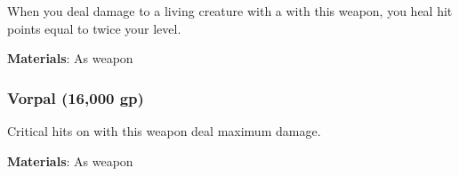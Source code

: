 When you deal damage to a living creature with a  with this weapon, you heal hit points equal to twice your level.



\vspace{0.25em}
\textbf{Materials}: As weapon


\lowercase{\hypertarget{item:Vorpal}{}}\label{item:Vorpal}
\hypertarget{item:Vorpal}{\subsubsection{Vorpal\hfill{} (16,000 gp)}}

Critical hits on  with this weapon deal maximum damage.



\vspace{0.25em}
\textbf{Materials}: As weapon
